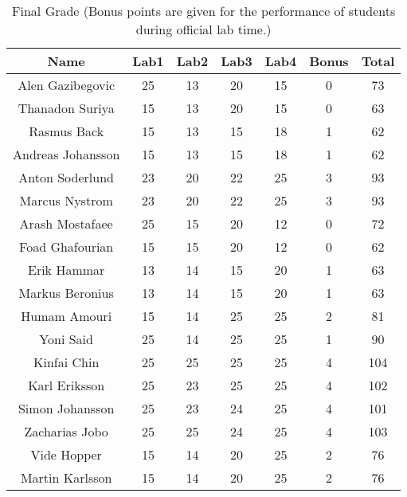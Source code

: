 \documentclass{article}
\begin{document}
\begin{table}[ht]
\caption{Final Grade (Bonus points are given for the performance of students during official lab time.)}
\centering
\begin{tabular}{c c c c c c c} 
\hline\hline 
Name & Lab1 & Lab2 & Lab3 & Lab4 & Bonus & Total \\ [0.5ex] 
\hline
Alen Gazibegovic 
& 25 & 13 & 20 & 15 & 0 & 73 \\
\hline
Thanadon Suriya 
& 15 & 13 & 20 & 15 & 0 & 63 \\
\hline
Rasmus Back 
& 15 & 13 & 15 & 18 & 1 & 62 \\
\hline 
Andreas Johansson
& 15 & 13 & 15 & 18 & 1 & 62 \\
\hline 
Anton Soderlund
& 23 & 20 & 22 & 25 & 3 & 93 \\
\hline 
Marcus Nystrom
& 23 & 20 & 22 & 25 & 3 & 93 \\
\hline
Arash Mostafaee
& 25 & 15 & 20 & 12 & 0 & 72 \\
\hline
Foad Ghafourian
& 15 & 15 & 20 & 12 & 0 & 62 \\
\hline
Erik Hammar
& 13 & 14 & 15 & 20 & 1 & 63 \\
\hline
Markus Beronius
& 13 & 14 & 15 & 20 & 1 & 63 \\
\hline 
Humam Amouri
& 15 & 14 & 25 & 25 & 2 & 81 \\
\hline 
Yoni Said
& 25 & 14 & 25 & 25 & 1 & 90 \\  
\hline
Kinfai Chin
& 25 & 25 & 25 & 25 & 4 & 104 \\
\hline
Karl Eriksson
& 25 & 23 & 25 & 25 & 4 & 102 \\ 
\hline
Simon Johansson
& 25 & 23 & 24 & 25 & 4 & 101 \\
\hline
Zacharias Jobo
& 25 & 25 & 24 & 25 & 4 & 103 \\
\hline
Vide Hopper
& 15 & 14 & 20 & 25 & 2 & 76 \\ [1ex]
\hline
Martin Karlsson
& 15 & 14 & 20 & 25 & 2 & 76 \\
\hline
\end{tabular}
\label{table:nonlin}
\end{table}
\end{document}
